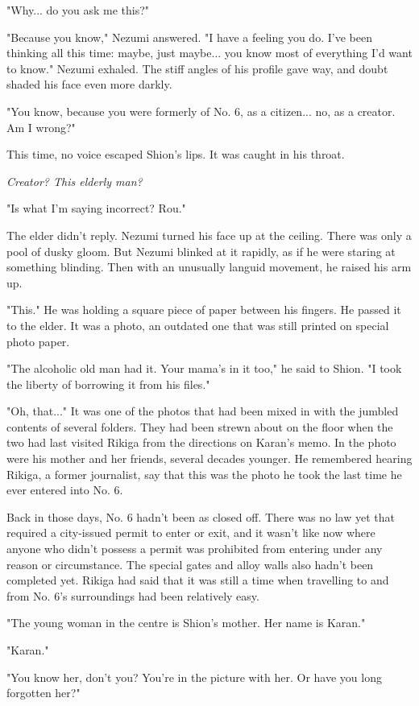 "Why... do you ask me this?"

"Because you know," Nezumi answered. "I have a feeling you do. I've been
thinking all this time: maybe, just maybe... you know most of everything
I'd want to know." Nezumi exhaled. The stiff angles of his profile gave
way, and doubt shaded his face even more darkly.

"You know, because you were formerly of No. 6, as a citizen... no, as a
creator. Am I wrong?"

This time, no voice escaped Shion's lips. It was caught in his throat.

\emph{Creator? This elderly man?}

"Is what I'm saying incorrect? Rou."

The elder didn't reply. Nezumi turned his face up at the ceiling. There
was only a pool of dusky gloom. But Nezumi blinked at it rapidly, as if
he were staring at something blinding. Then with an unusually languid
movement, he raised his arm up.

"This." He was holding a square piece of paper between his fingers. He
passed it to the elder. It was a photo, an outdated one that was still
printed on special photo paper.

"The alcoholic old man had it. Your mama's in it too," he said to Shion.
"I took the liberty of borrowing it from his files."

"Oh, that..." It was one of the photos that had been mixed in with the
jumbled contents of several folders. They had been strewn about on the
floor when the two had last visited Rikiga from the directions on
Karan's memo. In the photo were his mother and her friends, several
decades younger. He remembered hearing Rikiga, a former journalist, say
that this was the photo he took the last time he ever entered into No.
6.

Back in those days, No. 6 hadn't been as closed off. There was no law
yet that required a city-issued permit to enter or exit, and it wasn't
like now where anyone who didn't possess a permit was prohibited from
entering under any reason or circumstance. The special gates and alloy
walls also hadn't been completed yet. Rikiga had said that it was still
a time when travelling to and from No. 6's surroundings had been
relatively easy.

"The young woman in the centre is Shion's mother. Her name is Karan."

"Karan."

"You know her, don't you? You're in the picture with her. Or have you
long forgotten her?"

